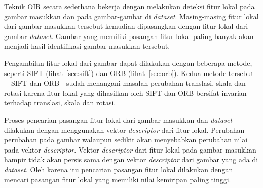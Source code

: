 Teknik OIR secara sederhana bekerja dengan melakukan deteksi fitur lokal pada gambar masukkan dan pada gambar-gambar di \textit{dataset}. Masing-masing fitur lokal dari gambar masukkan tersebut kemudian dipasangkan dengan fitur lokal dari gambar \textit{dataset}. Gambar yang memiliki pasangan fitur lokal paling banyak akan menjadi hasil identifikasi gambar masukkan tersebut.

Pengambilan fitur lokal dari gambar dapat dilakukan dengan beberapa metode, seperti SIFT (lihat~\ref{sec:sift}) dan ORB (lihat~\ref{sec:orb}). Kedua metode tersebut---SIFT dan ORB---sudah menangani masalah perubahan translasi, skala dan rotasi karena fitur lokal yang dihasilkan oleh SIFT dan ORB bersifat invarian terhadap translasi, skala dan rotasi.

Proses pencarian pasangan fitur lokal dari gambar masukkan dan \textit{dataset} dilakukan dengan menggunakan vektor \textit{descriptor} dari fitur lokal. Perubahan-perubahan pada gambar walaupun sedikit akan menyebabkan perubahan nilai pada vektor \textit{descriptor}. Vektor \textit{descriptor} dari fitur lokal pada gambar masukkan hampir tidak akan persis sama dengan vektor \textit{descriptor} dari gambar yang ada di \textit{dataset}. Oleh karena itu pencarian pasangan fitur lokal dilakukan dengan mencari pasangan fitur lokal yang memiliki nilai kemiripan paling tinggi.

